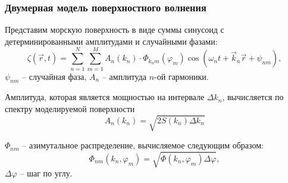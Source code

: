 \documentclass[10pt,pdf,hyperref={unicode}, dvipsnames]{beamer}
\renewcommand{\phi}{\varphi}
\begin{document}
\begin{frame}[t]

	\frametitle{Двумерная модель поверхностного волнения}
	Представим морскую поверхность в виде суммы синусоид с детерминированными амплитудами и случайными фазами:
\begin{equation}
	\zeta(\vec r, t)= \sum\limits_{n=1}^N \sum_{m=1}^M A_n(k_n)\cdot 
		\Phi_{k_nm}(\phi_m) \cos(\omega_n t + \vec k_n \vec r + \psi_{nm}),
\end{equation}
$\psi_{nm}$ -- случайная фаза, $A_n$ -- амплитуда $n$-ой гармоники.

Амплитуда, которая является мощностью на интервале $\Delta k_n$, вычисляется по спектру моделируемой поверхности
\begin{equation}
	A_n(k_n)=\sqrt{2 S(k_n) \Delta k_n}
\end{equation}

$\Phi_{nm}$ -- азимутальное распределение, вычисляемое следующим образом:
\begin{equation}
	\Phi_{nm}(k_n,\phi_m)=\sqrt{\Phi(k_n,\phi_m) \Delta \phi},
\end{equation}
$\Delta \phi$ -- шаг по углу.

\end{frame}
\end{document}
